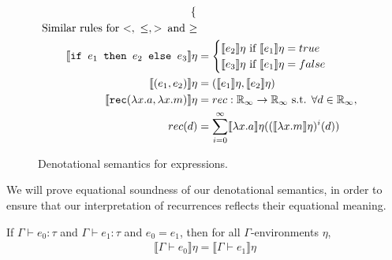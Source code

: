 \begin{figure}
\begin{align*}
\begin{cases}
   \end{cases}
 \\
\text{Similar rules for $<, \ \leq , >$\, and $\geq$} \\
  \llbracket \texttt{if } e_1 \texttt{ then } e_2 \texttt{ else } e_3 \rrbracket \eta &= 
 \begin{cases} 
      \llbracket e_2 \rrbracket\eta \text{ if } \llbracket e_1 \rrbracket\eta = true \\
      \llbracket e_3 \rrbracket\eta \text{ if } \llbracket e_1 \rrbracket\eta = false \\
   \end{cases}
  \\
    \llbracket (e_1,e_2) \rrbracket\eta &= (\llbracket e_1 \rrbracket\eta,\llbracket e_2 \rrbracket\eta) \\
   \llbracket  \texttt{rec} (\lambda x.a, \lambda x.m) \rrbracket\eta &= rec : \mathbb{R}_{\infty} \rightarrow \mathbb{R}_{\infty} \text{ s.t. } \forall d \in \mathbb{R}_{\infty}, \\
   rec(d) &= \sum_{i=0}^{\infty}\llbracket \lambda x.a \rrbracket\eta ((\llbracket \lambda x.m \rrbracket\eta)^i(d))
 \end{align*}
 \caption{Denotational semantics for expressions.}
 \label{fig:densemexps}
 \end{figure}
 
  We will prove equational soundness of our denotational semantics, in order to ensure that
 our interpretation of recurrences reflects their equational meaning.
 \begin{thm}
  If $\Gamma \vdash e_0 : \tau$ and $\Gamma \vdash e_1 : \tau$ and $e_0 = e_1$, then for all $\Gamma$-environments
  $\eta$,   
 \begin{align*}
 \llbracket \Gamma \vdash e_0 \rrbracket \eta 
 = \llbracket \Gamma \vdash e_1 \rrbracket \eta 
 \end{align*} 
 \end{thm}
 
